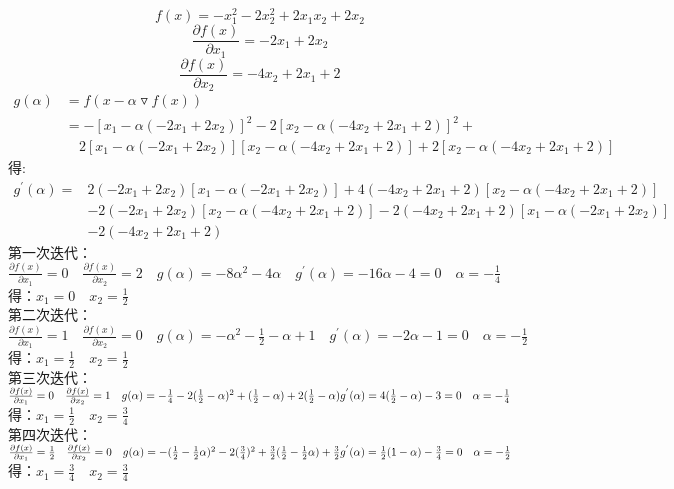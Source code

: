 \documentclass[12pt]{article}
\begin{document}
\section{}
\noindent
\[f(x)=-x_1^2-2x_2^2+2x_1x_2+2x_2\]
\[\frac{\partial f(x)}{\partial x_1}=-2x_1+2x_2\]
\[\frac{\partial f(x)}{\partial x_2}=-4x_2+2x_1+2\]
\begin{equation*}
    \begin{split}
        g(\alpha)&=f(x-\alpha \triangledown f(x))\\
        &=-[x_1-\alpha (-2x_1+2x_2)]^2-2[x_2-\alpha (-4x_2+2x_1+2)]^2+\\
          &\quad 2[x_1-\alpha (-2x_1+2x_2)][x_2-\alpha (-4x_2+2x_1+2)]+2[x_2-\alpha (-4x_2+2x_1+2)]
    \end{split}
\end{equation*}
得:
\begin{equation*}
    \begin{split}
        g^{'}(\alpha)=&2(-2x_1+2x_2)[x_1-\alpha (-2x_1+2x_2)]+4(-4x_2+2x_1+2)[x_2-\alpha (-4x_2+2x_1+2)]\\
        &-2(-2x_1+2x_2)[x_2-\alpha (-4x_2+2x_1+2)]-2(-4x_2+2x_1+2)[x_1-\alpha (-2x_1+2x_2)]\\
        &-2(-4x_2+2x_1+2)
    \end{split}
\end{equation*}
第一次迭代：\\
$\frac{\partial f(x)}{\partial x_1}=0 \quad \frac{\partial f(x)}{\partial x_2}=2 \quad g(\alpha)=-8\alpha ^2-4\alpha 
\quad g^{'}(\alpha)=-16\alpha-4=0 \quad \alpha=-\frac{1}{4}$\\
得：$x_1=0 \quad x_2=\frac{1}{2}$\\
第二次迭代：\\
$\frac{\partial f(x)}{\partial x_1}=1 \quad \frac{\partial f(x)}{\partial x_2}=0 \quad g(\alpha)=-\alpha ^2-\frac{1}{2}-\alpha+1 
\quad g^{'}(\alpha)=-2\alpha-1=0 \quad \alpha=-\frac{1}{2}$\\
得：$x_1=\frac{1}{2} \quad x_2=\frac{1}{2}$\\
第三次迭代：\\
$\frac{\partial f(x)}{\partial x_1}=0 \quad \frac{\partial f(x)}{\partial x_2}=1 \quad g(\alpha)=-\frac{1}{4}-2(\frac{1}{2}-\alpha)^2+(\frac{1}{2}-\alpha)+2(\frac{1}{2}-\alpha)
\\ g^{'}(\alpha)=4(\frac{1}{2}-\alpha)-3=0 \quad \alpha=-\frac{1}{4}$ \\
得：$x_1=\frac{1}{2} \quad x_2=\frac{3}{4}$ \\
第四次迭代：\\
$\frac{\partial f(x)}{\partial x_1}=\frac{1}{2} \quad \frac{\partial f(x)}{\partial x_2}=0
\quad g(\alpha)=-(\frac{1}{2}-\frac{1}{2}\alpha)^2-2(\frac{3}{4})^2+\frac{3}{2}(\frac{1}{2}-\frac{1}{2}\alpha)+\frac{3}{2}
\\ g^{'}(\alpha)=\frac{1}{2}(1-\alpha)-\frac{3}{4}=0 \quad \alpha=-\frac{1}{2}$\\
得：$x_1=\frac{3}{4} \quad x_2=\frac{3}{4}$
\end{document}
